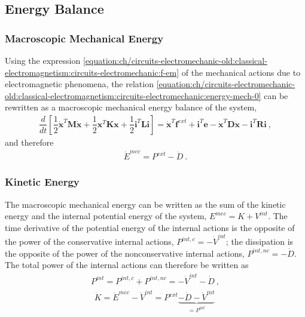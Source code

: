 \documentclass[letterpaper,10pt,english]{jupyterBook}
\begin{document}
\subsection{Energy Balance}
\label{\detokenize{ch/circuits-electromechanic-old:energy-balance}}

\subsubsection{Macroscopic Mechanical Energy}
\label{\detokenize{ch/circuits-electromechanic-old:macroscopic-mechanical-energy}}
\sphinxAtStartPar
Using the expression \eqref{equation:ch/circuits-electromechanic-old:classical-electromagnetism:circuits-electromechanic:f-em} of the mechanical actions due to electromagnetic phenomena, the relation \eqref{equation:ch/circuits-electromechanic-old:classical-electromagnetism:circuits-electromechanic:energy-mech-0} can be rewritten as a macroscopic mechanical energy balance of the system,
\begin{equation*}
\begin{split}\dfrac{d}{dt} \left[ \dfrac{1}{2} \dot{\mathbf{x}}^T \mathbf{M} \dot{\mathbf{x}} + \dfrac{1}{2} \mathbf{x}^T \mathbf{K} \mathbf{x} + \dfrac{1}{2} \mathbf{i}^T \mathbf{L} \mathbf{i} \right] = \dot{\mathbf{x}}^T \mathbf{f}^{ext} + \mathbf{i}^T \mathbf{e} - \dot{\mathbf{x}}^T \mathbf{D} \dot{\mathbf{x}} - \mathbf{i}^T \mathbf{R} \mathbf{i} \ , \end{split}
\end{equation*}
\sphinxAtStartPar
and therefore
\begin{equation*}
\begin{split}\dot{E}^{mec} = P^{ext} - \dot{D} \ .\end{split}
\end{equation*}

\subsubsection{Kinetic Energy}
\label{\detokenize{ch/circuits-electromechanic-old:kinetic-energy}}
\sphinxAtStartPar
The macroscopic mechanical energy can be written as the sum of the kinetic energy and the internal potential energy of the system, \(E^{mec} = K + V^{int}\). The time derivative of the potential energy of the internal actions is the opposite of the power of the conservative internal actions, \(P^{int, c} = - \dot{V}^{int}\); the dissipation is the opposite of the power of the non\sphinxhyphen{}conservative internal actions, \(P^{int, nc} = - \dot{D}\). The total power of the internal actions can therefore be written as
\begin{equation*}
\begin{split}P^{int} = P^{int, c} + P^{int, nc} = - \dot{V}^{int} - \dot{D} \ ,\end{split}
\end{equation*}\begin{equation*}
\begin{split}\dot{K} = \dot{E}^{mec} - \dot{V}^{int} = P^{ext} \underbrace{- \dot{D} - \dot{V}^{int}}_{=P^{int}} \  \end{split}
\end{equation*}
\end{document}

